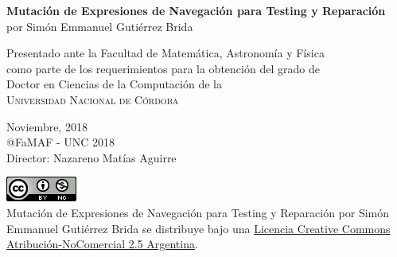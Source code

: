 \begin{titlepage}

\begin{center}
{\LARGE \textbf{Mutaci\'on de Expresiones de Navegaci\'on para Testing y Reparaci\'on}}\\ 
\vspace{4mm}
{\Large por Sim\'on Emmanuel Guti\'errez Brida}\\

\vspace{50mm}

Presentado ante la Facultad de Matem\'atica, Astronom\'ia y F\'isica\\
como parte de los requerimientos para la obtenci\'on del grado de\\
Doctor en Ciencias de la Computaci\'on de la\\
\textsc{Universidad Nacional de C\'ordoba}\\
 
\vspace{50mm}

Noviembre, 2018\\
@FaMAF - UNC 2018\\
{\Large Director: Nazareno Mat\'ias Aguirre}

\vspace{10mm}
\href{https://i.creativecommons.org/l/by-nc/2.5/ar/88x31.png}{\includegraphics{images/licencia-famaf.png}}\\
{Mutaci\'on de Expresiones de Navegaci\'on para Testing y Reparaci\'on por Sim\'on Emmanuel Guti\'errez Brida se distribuye bajo una \href{http://creativecommons.org/licenses/by-nc/2.5/ar/}{Licencia Creative Commons Atribuci\'on-NoComercial 2.5 Argentina}.}
\end{center}  
\end{titlepage} 



